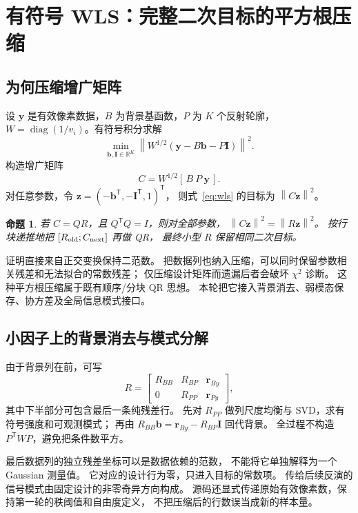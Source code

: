 \documentclass[UTF8,11pt,a4paper,fontset=fandol]{ctexart}
\newcommand{\R}{\mathbb R}
\newcommand{\diag}{\operatorname{diag}}
\newcommand{\norm}[1]{\left\lVert#1\right\rVert}
\newcommand{\T}{^{\mathsf T}}
\newtheorem{proposition}{命题}[section]
\begin{document}
\section{有符号 WLS：完整二次目标的平方根压缩}

\subsection{为何压缩增广矩阵}

设 $\bm y$ 是有效像素数据，$B$ 为背景基函数，$P$ 为 $K$ 个反射轮廓，
$W=\diag(1/v_i)$。有符号积分求解
\begin{equation}
\min_{\bm b,\bm I\in\R^K}
\norm{W^{1/2}(\bm y-B\bm b-P\bm I)}^2 .
\label{eq:wls}
\end{equation}
构造增广矩阵
\[
C=W^{1/2}[\,B\ P\ \bm y\,] .
\]
对任意参数，令 $\bm z=(-\bm b\T,-\bm I\T,1)\T$，
则式~\eqref{eq:wls} 的目标为 $\norm{C\bm z}^2$。

\begin{proposition}
若 $C=QR$，且 $Q\T Q=I$，则对全部参数，
$\norm{C\bm z}^2=\norm{R\bm z}^2$。
按行块递推地把 $[R_{\rm old};C_{\rm next}]$ 再做 QR，
最终小型 $R$ 保留相同二次目标。
\end{proposition}

证明直接来自正交变换保持二范数。
把数据列也纳入压缩，可以同时保留参数相关残差和无法拟合的常数残差；
仅压缩设计矩阵而遗漏后者会破坏 $\chi^2$ 诊断。
这种平方根压缩属于既有顺序/分块 QR 思想\cite{demmel2008}。
本轮把它接入背景消去、弱模态保存、协方差及全局信息模式接口。

\subsection{小因子上的背景消去与模式分解}

由于背景列在前，可写
\[
R=\begin{bmatrix}
R_{BB}&R_{BP}&\bm r_{By}\\
0&R_{PP}&\bm r_{Py}
\end{bmatrix},
\]
其中下半部分可包含最后一条纯残差行。
先对 $R_{PP}$ 做列尺度均衡与 SVD，求有符号强度和可观测模式；
再由
$R_{BB}\bm b=\bm r_{By}-R_{BP}\bm I$ 回代背景。
全过程不构造 $P\T WP$，避免把条件数平方。

最后数据列的独立残差坐标可以是数据依赖的范数，
不能将它单独解释为一个 Gaussian 测量值。
它对应的设计行为零，只进入目标的常数项。
传给后续反演的信号模式由固定设计的非零奇异方向构成。
源码还显式传递原始有效像素数，保持第一轮的秩阈值和自由度定义，
不把压缩后的行数误当成新的样本量。
\end{document}
